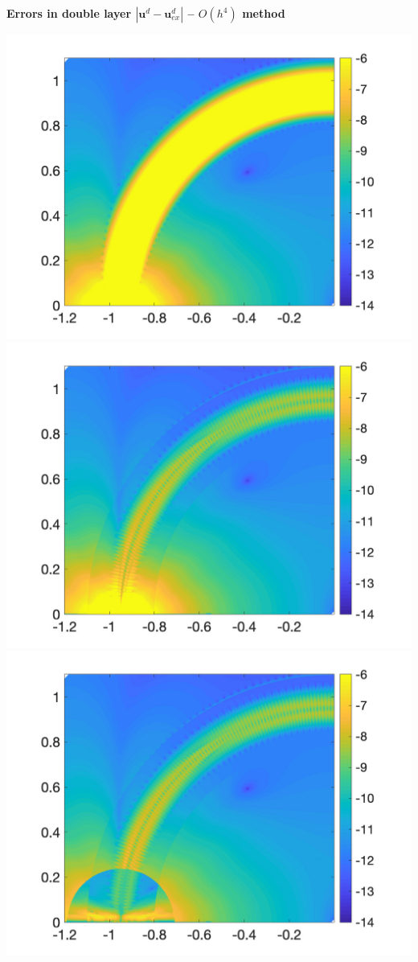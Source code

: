 \newpage
\centerline{\textbf{\Large Errors in double layer $|\mathbf{u}^d-\mathbf{u}^d_{ex}|$ --  $O(h^4)$ method}}
\bigskip
\noindent
\includegraphics[trim=40 20 40 10, clip, width=2.5truein]{figs/fig100a4} 
\includegraphics[trim=40 20 40 10, clip, width=2.5truein]{figs/fig100b4} 
\includegraphics[trim=40 20 40 10, clip, width=2.5truein]{figs/fig100c4} \\
